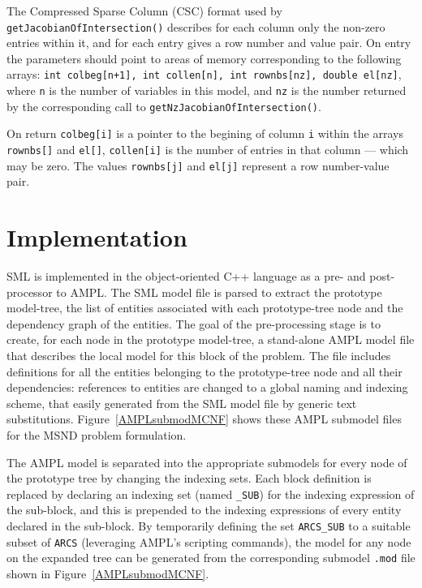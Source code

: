 \documentclass[10pt,a4paper]{book}
\begin{document}
The Compressed Sparse Column (CSC) format used by 
{\tt getJacobianOfIntersection()} describes for each column only the non-zero
entries within it, and for each entry gives a row number and value pair. On
entry the parameters should point to areas of memory corresponding to the
following arrays: {\tt int colbeg[n+1], int collen[n], int rownbs[nz],
double el[nz]}, where {\tt n} is the number of variables in this model, and
{\tt nz} is the number returned by the corresponding call to
{\tt getNzJacobianOfIntersection()}.

On return {\tt colbeg[i]} is a pointer to the begining of column {\tt i}
within the arrays {\tt rownbs[]} and {\tt el[]}, {\tt collen[i]} is the number
of entries in that column --- which may be zero. The values {\tt rownbs[j]} and
{\tt el[j]} represent a row number-value pair.

\section{Implementation} \label{implementation}

SML is implemented in the object-oriented C++ language as a
pre- and post-processor to AMPL.  
The SML model file
is parsed to extract the prototype model-tree, the list of entities
associated with each prototype-tree node and the dependency graph of
the entities. 
The goal of the pre-processing stage is to create, for each node in the
prototype model-tree, a stand-alone AMPL model file that describes the
local model for this block of the problem. 
The file includes definitions for all the
entities belonging to the prototype-tree node and all their
dependencies: references to entities are changed to a
global naming and indexing scheme, that easily generated from the
SML model file by generic text substitutions.  
Figure~\ref{AMPLsubmodMCNF} shows these AMPL submodel files for the MSND problem formulation. 

The AMPL model is separated into the appropriate submodels for every node
of the prototype tree by changing the indexing sets.
Each block definition is replaced
by declaring an indexing set (named {\tt *\_SUB}) for the
indexing expression of the sub-block, and this is prepended to the
indexing expressions of every entity declared in the sub-block. By
temporarily defining the set {\tt ARCS\_SUB} to a suitable subset of {\tt ARCS} 
(leveraging AMPL's scripting commands), the
model for any node on the expanded tree can be generated from the
corresponding submodel {\tt *.mod} file shown in Figure~\ref{AMPLsubmodMCNF}.
\end{document}
